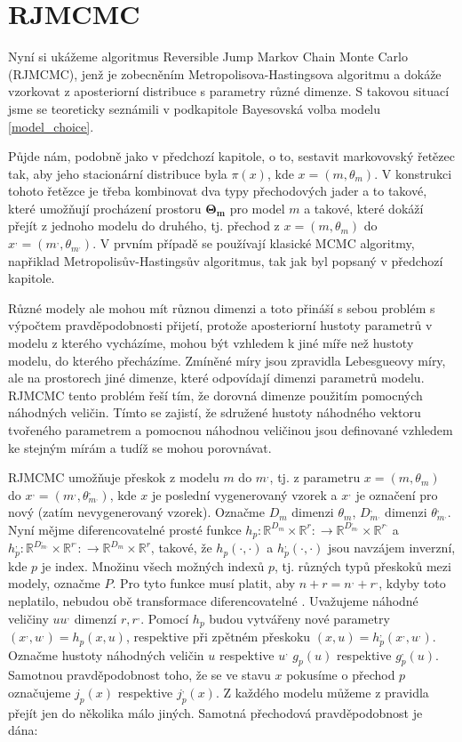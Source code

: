 \documentclass[czech,master,public,dept470,male,cpdeclaration,oneside, python]{diploma}
\begin{document}
\section{RJMCMC}
Nyní si ukážeme algoritmus Reversible Jump Markov Chain Monte Carlo (RJMCMC)\cite{green2009reversible}, jenž je zobecněním Metropolisova-Hastingsova algoritmu a dokáže vzorkovat z aposteriorní distribuce s parametry různé dimenze. S takovou situací jsme se teoreticky seznámili v podkapitole Bayesovská volba modelu \ref{model_choice}. 
 \par
Půjde nám, podobně jako v předchozí kapitole, o to, sestavit markovovský řetězec tak, aby jeho stacionární distribuce byla $\pi(x)$, kde $x = (m, \theta_m)$. V konstrukci tohoto řetězce je třeba kombinovat dva typy přechodových jader a to takové, které umožňují procházení prostoru $\boldsymbol{\Theta_m}$  pro  model $m$ a takové, které dokáží přejít z jednoho modelu do druhého, tj. přechod z $x=(m, \theta_m)$ do $x^{,} = (m^{,}, \theta_{m^{,}})$. V prvním případě se používají klasické MCMC algoritmy, napřiklad Metropolisův-Hastingsův algoritmus, tak jak byl popsaný v předchozí kapitole. \par
Různé modely ale mohou mít různou dimenzi a toto přináší s sebou problém s výpočtem pravděpodobnosti přijetí, protože aposteriorní hustoty parametrů v modelu z kterého vycházíme, mohou být vzhledem k jiné míře než hustoty modelu, do kterého přecházíme. Zmíněné míry jsou zpravidla Lebesgueovy míry, ale na prostorech jiné dimenze, které odpovídají dimenzi parametrů modelu. RJMCMC tento problém řeší tím, že dorovná dimenze použitím pomocných náhodných veličin. Tímto se zajistí, že sdružené hustoty náhodného vektoru tvořeného parametrem a pomocnou náhodnou veličinou jsou definované vzhledem ke stejným mírám a tudíž se mohou porovnávat.  \par 
RJMCMC umožňuje přeskok z modelu $m$ do $m^{,}$, tj. z parametru $x=(m, \theta_m)$ do $x^{,}=(m^{,}, \theta^{,}_{m^{,}})$, kde $x$ je poslední vygenerovaný vzorek a $x^{,}$ je označení pro nový (zatím nevygenerovaný vzorek). Označme $D_m$ dimenzi $\theta_m$, $D^{,}_{m^{,}}$ dimenzi $\theta^{,}_{m^{,}}$. Nyní mějme diferencovatelné prosté funkce 
$h_p: \mathbb{R}^{D_m} \times \mathbb{R}^r: \rightarrow \mathbb{R}^{D^{,}_{m^{,}}} \times \mathbb{R}^{r^{,}}$ 
a 
$h^{,}_p: \mathbb{R}^{D^{,}_{m^{,}}} \times \mathbb{R}^{r^{,}} : \rightarrow \mathbb{R}^{D_m} \times \mathbb{R}^r$, takové, že $h_p(\cdot, \cdot)$ a $h_p^{,}(\cdot, \cdot)$ jsou navzájem inverzní, kde $p$ je index. Množinu všech možných indexů $p$, tj. různých typů přeskoků mezi modely, označme $P$. Pro tyto funkce musí platit, aby $n+r=n^{,}+r^{,}$, kdyby toto neplatilo, nebudou obě transformace diferencovatelné \cite{green2009reversible}. Uvažujeme náhodné veličiny $u u^{,}$ dimenzí $r, r^{,}$. Pomocí $h_p$ budou vytvářeny nové parametry $(x^{,}, u^{,}) = h_p(x, u)$, respektive při zpětném přeskoku $(x, u) = h^{,}_p(x^{,}, u^{,})$. Označme hustoty náhodných veličin $u$ respektive $u^{,}$ $g_p(u)$ respektive $g^{,}_p(u)$. Samotnou pravděpodobnost toho, že se ve stavu $x$ pokusíme o přechod $p$ označujeme $j_p(x)$ respektive $j^{,}_p(x)$. Z každého modelu můžeme z pravidla přejít jen do několika málo jiných.    Samotná přechodová pravděpodobnost je dána:
\end{document}
